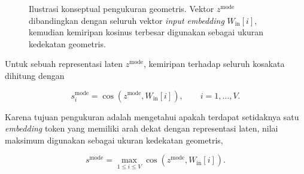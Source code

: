 \begin{figure}[htbp]
    \caption{%
        Ilustrasi konseptual pengukuran geometris. Vektor $z^{\mathrm{mode}}$
        dibandingkan dengan seluruh vektor \textit{input embedding}
        $W_{\mathrm{in}}[i]$, kemudian kemiripan kosinus terbesar digunakan
        sebagai ukuran kedekatan geometris.}
    \label{fig:pengukuran-geometris}
\end{figure}

Untuk sebuah representasi laten $z^{\mathrm{mode}}$, kemiripan terhadap seluruh
kosakata dihitung dengan

\begin{equation}
    s_i^{\mathrm{mode}}
    =
    \cos
    \left(
        z^{\mathrm{mode}},
        W_{\mathrm{in}}[i]
    \right),
    \qquad
    i=1,\ldots,V.
    \label{eq:geo-cosine-token}
\end{equation}

Karena tujuan pengukuran adalah mengetahui apakah terdapat setidaknya satu
\textit{embedding} token yang memiliki arah dekat dengan representasi laten,
nilai maksimum digunakan sebagai ukuran kedekatan geometris,

\begin{equation}
    s^{\mathrm{mode}}
    =
    \max_{1\leq i\leq V}
    \cos
    \left(
        z^{\mathrm{mode}},
        W_{\mathrm{in}}[i]
    \right).
    \label{eq:geo-max-cosine}
\end{equation}

